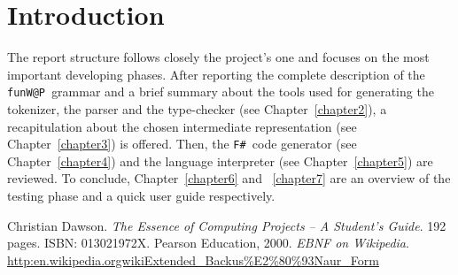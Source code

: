 \documentclass[]{final_report}
\makeatletter
\newcommand{\fwap}{\texttt{funW@P }}
\newcommand{\fsharp}{\texttt{F\# }}
\makeatother
\begin{document}
\maketitle
\tableofcontents{}\newpage


\begin{abstract}

The aim of this report is to offer an overview of the  \fwap  implementation and of the main design choices made during its development. Also, this document is intended both as a reference and a manual for the user wishing to use or extend our simple language. 

All the information provided here will also be available at the official page of the project on GitHub \href{https://github.com/MCSN-project2014/APproject}{(https://github.com/MCSN-project2014/APproject)}.

\end{abstract}

\newpage



\chapter{Introduction}

The report structure follows closely the project's one and focuses on the most important developing phases. After reporting the complete description of the \fwap grammar and a brief summary about the tools used for generating the tokenizer, the parser and the type-checker (see Chapter~\ref{chapter2}), a recapitulation about the chosen intermediate representation (see Chapter~\ref{chapter3}) is offered. Then, the \fsharp code generator (see Chapter~\ref{chapter4}) and the language interpreter (see Chapter~\ref{chapter5}) are reviewed. To conclude, Chapter~\ref{chapter6} and ~\ref{chapter7} are an overview of the testing phase and a quick user guide respectively.








\newpage
\begin{thebibliography}{99}
 Christian Dawson. \emph{The Essence of Computing Projects -- A Student's Guide}. 192 pages. ISBN: 013021972X. Pearson Education, 2000.
\emph{EBNF on Wikipedia}. \href{http:\/\/en.wikipedia.org\/wiki\/Extended\_Backus\%E2\%80\%93Naur\_Form}{http:\/\/en.wikipedia.org\/wiki\/Extended\_Backus\%E2\%80\%93Naur\_Form}
\end{thebibliography}
\end{document}
